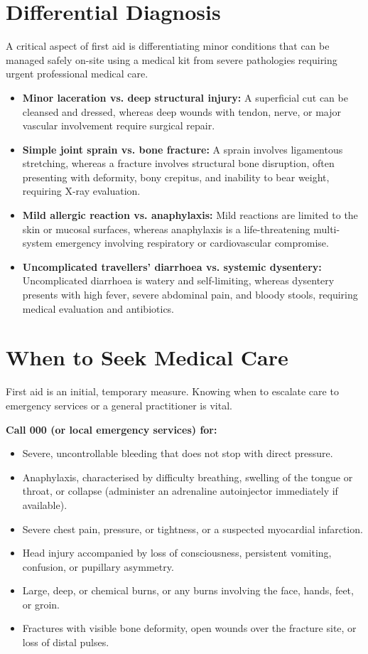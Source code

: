 \section*{Differential Diagnosis}
A critical aspect of first aid is differentiating minor conditions that can be managed safely on-site using a medical kit from severe pathologies requiring urgent professional medical care.
\begin{itemize}
    \item \textbf{Minor laceration vs. deep structural injury:} A superficial cut can be cleansed and dressed, whereas deep wounds with tendon, nerve, or major vascular involvement require surgical repair.
    \item \textbf{Simple joint sprain vs. bone fracture:} A sprain involves ligamentous stretching, whereas a fracture involves structural bone disruption, often presenting with deformity, bony crepitus, and inability to bear weight, requiring X-ray evaluation.
    \item \textbf{Mild allergic reaction vs. anaphylaxis:} Mild reactions are limited to the skin or mucosal surfaces, whereas anaphylaxis is a life-threatening multi-system emergency involving respiratory or cardiovascular compromise.
    \item \textbf{Uncomplicated travellers' diarrhoea vs. systemic dysentery:} Uncomplicated diarrhoea is watery and self-limiting, whereas dysentery presents with high fever, severe abdominal pain, and bloody stools, requiring medical evaluation and antibiotics.
\end{itemize}

\section*{When to Seek Medical Care}
First aid is an initial, temporary measure. Knowing when to escalate care to emergency services or a general practitioner is vital.

\textbf{Call 000 (or local emergency services) for:}
\begin{itemize}
    \item Severe, uncontrollable bleeding that does not stop with direct pressure.
    \item Anaphylaxis, characterised by difficulty breathing, swelling of the tongue or throat, or collapse (administer an adrenaline autoinjector immediately if available).
    \item Severe chest pain, pressure, or tightness, or a suspected myocardial infarction.
    \item Head injury accompanied by loss of consciousness, persistent vomiting, confusion, or pupillary asymmetry.
    \item Large, deep, or chemical burns, or any burns involving the face, hands, feet, or groin.
    \item Fractures with visible bone deformity, open wounds over the fracture site, or loss of distal pulses.
\end{itemize}


